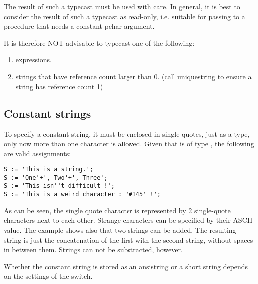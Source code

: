 The result of such a typecast must be used with care. In general, it is best
to consider the result of such a typecast as read-only, i.e. suitable for
passing to a procedure that needs a constant pchar argument.

It is therefore NOT advisable to typecast one of the following:
\begin{enumerate}
\item expressions.
\item strings that have reference count larger than 0.
(call uniquestring to ensure a string has reference count 1)
\end{enumerate}

\subsection{Constant strings}

To specify a constant string, it must be enclosed in single-quotes, just
as a  type, only now more than one character is allowed.
Given that  is of type , the following are valid assignments:
\begin{verbatim}
S := 'This is a string.';
S := 'One'+', Two'+', Three';
S := 'This isn''t difficult !';
S := 'This is a weird character : '#145' !';
\end{verbatim}
As can be seen, the single quote character is represented by 2 single-quote
characters next to each other. Strange characters can be specified by their
ASCII value.
The example shows also that two strings can be added. The resulting string is
just the concatenation of the first with the second string, without spaces in
between them. Strings can not be substracted, however.

Whether the constant string is stored as an ansistring or a short string
depends on the settings of the  switch.

